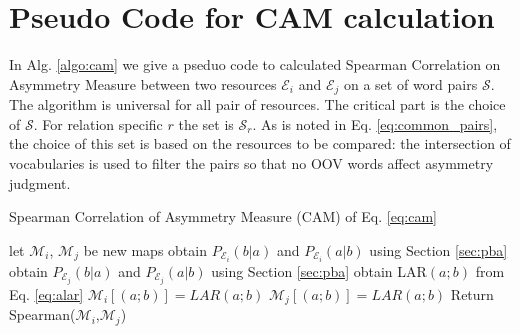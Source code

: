 \documentclass[letterpaper]{article} %
\begin{document}
\section{Pseudo Code for CAM calculation}

In Alg. \ref{algo:cam} we give a pseduo code to calculated Spearman Correlation on Asymmetry Measure between two resources $\mathcal{E}_i$ and $\mathcal{E}_j$ on a set of word pairs $\mathcal{S}$. The algorithm is universal for all pair of resources. The critical part is the choice of $\mathcal{S}$. For relation specific $r$ the set is $\mathcal{S}_r$. As is noted in Eq. \ref{eq:common_pairs}, the choice of this set is based on the resources to be compared: the intersection of vocabularies is used to filter the pairs so that no OOV words affect asymmetry judgment.

\begin{algorithm}[!]
   \caption{Spearman Correlation of Asymmetry Measure (CAM) of Eq. \ref{eq:cam}}
    \begin{algorithmic}
       
        \State let $\mathcal{M}_i$, $\mathcal{M}_j$ be new maps 
            \State obtain $P_{\mathcal{E}_i}(b|a)$ and $P_{\mathcal{E}_i}(a|b)$ using Section \ref{sec:pba} 
            \State obtain $P_{\mathcal{E}_j}(b|a)$ and $P_{\mathcal{E}_j}(a|b)$ using Section \ref{sec:pba}
            \State obtain LAR$(a;b)$ from Eq. \ref{eq:alar}
            \State $\mathcal{M}_i[(a;b)]=LAR(a;b)$
            \State $\mathcal{M}_j[(a;b)]=LAR(a;b)$
        \EndFor
        \State Return Spearman($\mathcal{M}_i$,$\mathcal{M}_j$)
       \EndFunction
\end{algorithmic}
\label{algo:cam}
\end{algorithm}
\end{document}
